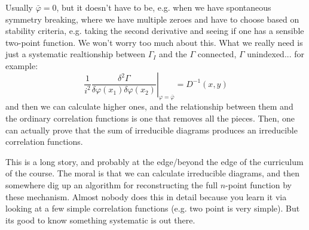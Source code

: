 Usually $\bar{\varphi} = 0$, but it doesn't have to be, e.g. when we have spontaneous symmetry breaking, where we have multiple zeroes and have to choose based on stability criteria, e.g. taking the second derivative and seeing if one has a sensible two-point function. We won't worry too much about this. What we really need is just a systematic realtionship between $\Gamma_I$ and the $\Gamma$ connected, $\Gamma$ unindexed... for example:
\begin{equation}
    \left.\frac{1}{i^2}\frac{\delta^2\Gamma}{\delta\varphi(x_1)\delta\varphi(x_2)}\right|_{\varphi = \bar{\varphi}} = D^{-1}(x, y)
\end{equation}
and then we can calculate higher ones, and the relationship between them and the ordinary correlation functions is one that removes all the pieces. Then, one can actually prove that the sum of irreducible diagrams produces an irreducible correlation functions.

This is a long story, and probably at the edge/beyond the edge of the curriculum of the course. The moral is that we can calculate irreducible diagrams, and then somewhere dig up an algorithm for reconstructing the full $n$-point function by these mechanism. Almost nobody does this in detail because you learn it via looking at a few simple correlation functions (e.g. two point is very simple). But its good to know something systematic is out there.
